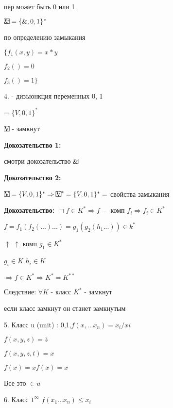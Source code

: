 \documentclass[russian]{lecture-notes}
\begin{document}
\begin{example}
		пер может быть 0 или 1

		\begin{proposition}%
			$\frame{\&} = \{\&,0,1\}^{*}$

			по определению замыкания

			$\{f_{1}(x,y) = x*y$

			$f_{2}() = 0$

			$f_{3}() = 1\}$

			\end{proposition}

		4.  - дизъюнкция переменных 0, 1

		 = $\{V,0,1\}^{*}$

		\begin{proposition}

			$\frame{V} $ - замкнут

			\end{proposition}

		\textbf{Докозательство 1: }

		смотри докозательство $\frame{\&}$


		\textbf{Докозательство 2: }

		$\frame{V} = \{V,0,1\}^{*} \Rightarrow \frame{V}^{*} = \{V,0,1\}^{*} = $ свойства замыкания

		\end{example}

	\textbf{Докозательство: } $\sqsupset  f \in K^{*} \Rightarrow f - $ комп $f_{i}
	\Rightarrow f_{i} \in K^{*}
	$

	$ f = f_{1} (f_2(...)...) = g_{1}(g_{2}(h_{1}...)) \in k^{*}
	$

	\qquad $\uparrow$ \quad $\uparrow$ \qquad комп $g_{1} \in K^{*}$

	$g_{i} \in K $ $h_{i} \in K$

	$\Rightarrow f \in K^{*} \Rightarrow K^{*} = K^{**}$

	Следствие: $\forall K$ - класс $K^{*}$ - замкнут

	если класс замкнут он станет замкнутым

	5. Класс u (unit) : 0,1,$f(x,...x_{n}) = x_{i}/x{i}$

	$f(x,y,z) = \bar{z}$

	$f(x,y,z,t) = x$

	$f(x) = x f(x) = \bar{x}$

	Все это $\in u$

	6. Класс $1^{\infty}$ $f(x_{1}...x_{n}) \leqslant x_{i} $
\end{document}
